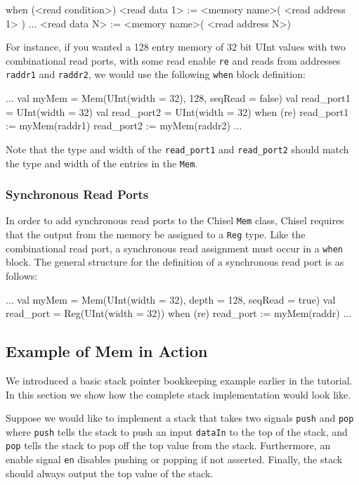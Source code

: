 \begin{scala}
when (<read condition>) {
  <read data 1> := <memory name>( <read address 1> )
  ...
  <read data N> := <memory name>( <read address N>)
}
\end{scala}

For instance, if you wanted a 128 entry memory of 32 bit UInt values with two combinational read ports, with some read enable \verb+re+ and reads from addresses \verb+raddr1+ and \verb+raddr2+, we would use the following \verb+when+ block definition:

\begin{scala}
...
val myMem = Mem(UInt(width = 32), 128, seqRead = false)
val read_port1 = UInt(width = 32)
val read_port2 = UInt(width = 32)
when (re) {
  read_port1 := myMem(raddr1)
  read_port2 := myMem(raddr2)
}
...
\end{scala}

Note that the type and width of the \verb+read_port1+ and \verb+read_port2+ should match the type and width of the entries in the \verb+Mem+.

\subsubsection{Synchronous Read Ports}

In order to add synchronous read ports to the Chisel \verb+Mem+ class, Chisel requires that the output from the memory be assigned to a \verb+Reg+ type. Like the combinational read port, a synchronous read assignment must occur in a \verb+when+ block. The general structure for the definition of a synchronous read port is as follows:

\begin{scala}
...
val myMem = Mem(UInt(width = 32), depth = 128, seqRead = true)
val read_port = Reg(UInt(width = 32))
when (re) {
  read_port := myMem(raddr)
}
...
\end{scala}

\subsection{Example of Mem in Action}

We introduced a basic stack pointer bookkeeping example earlier in the tutorial. In this section we show how the complete stack implementation would look like.

Suppose we would like to implement a stack that takes two signals \verb+push+ and \verb+pop+ where \verb+push+ tells the stack to push an input \verb+dataIn+ to the top of the stack, and \verb+pop+ tells the stack to pop off the top value from the stack. Furthermore, an enable signal \verb+en+ disables pushing or popping if not asserted. Finally, the stack should always output the top value of the stack.

